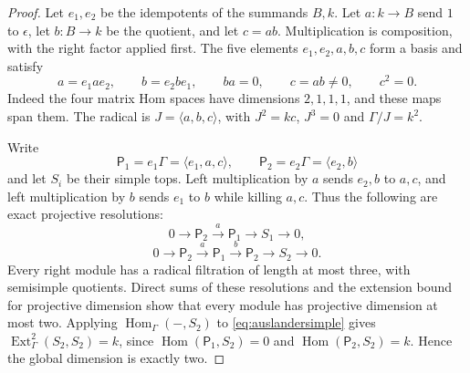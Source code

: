 \documentclass[11pt,a4paper]{article}
\theoremstyle{named}\newtheorem{finding}{Finding}[section]
\theoremstyle{definition}\newtheorem{definition}[finding]{Definition}
\theoremstyle{remark}\newtheorem{remark}[finding]{Remark}
\begin{document}
\begin{proof}
Let $e_1,e_2$ be the idempotents of the summands $B,k$.
Let $a:k\to B$ send $1$ to $\epsilon$, let $b:B\to k$ be
the quotient, and let $c=ab$. Multiplication is composition,
with the right factor applied first. The five elements
$e_1,e_2,a,b,c$ form a basis and satisfy
\[
 a=e_1ae_2,\qquad b=e_2be_1,\qquad ba=0,\qquad
 c=ab\ne0,\qquad c^2=0.
\]
Indeed the four matrix Hom spaces have dimensions $2,1,1,1$,
and these maps span them. The radical is
$J=\langle a,b,c\rangle$, with $J^2=kc$, $J^3=0$ and
$\Gamma/J=k^2$.

Write
\[
 \mathsf P_1=e_1\Gamma=\langle e_1,a,c\rangle,\qquad
 \mathsf P_2=e_2\Gamma=\langle e_2,b\rangle
\]
and let $S_i$ be their simple tops.
Left multiplication by $a$ sends $e_2,b$ to $a,c$, and left
multiplication by $b$ sends $e_1$ to $b$ while killing $a,c$.
Thus the following are exact projective resolutions:
\[
 0\longrightarrow\mathsf P_2\xrightarrow{a}\mathsf P_1
   \longrightarrow S_1\longrightarrow0,
\]
\begin{equation}\label{eq:auslandersimple}
 0\longrightarrow\mathsf P_2\xrightarrow{a}\mathsf P_1
   \xrightarrow{b}\mathsf P_2\longrightarrow S_2
   \longrightarrow0.
\end{equation}
Every right module has a radical filtration of length at most
three, with semisimple quotients. Direct sums of these resolutions
and the extension bound for projective dimension show that every
module has projective dimension at most two. Applying
$\operatorname{Hom}_\Gamma(-,S_2)$ to
\eqref{eq:auslandersimple} gives
$\operatorname{Ext}^2_\Gamma(S_2,S_2)=k$, since
$\operatorname{Hom}(\mathsf P_1,S_2)=0$ and
$\operatorname{Hom}(\mathsf P_2,S_2)=k$. Hence the global
dimension is exactly two.


\end{proof}
\end{document}
